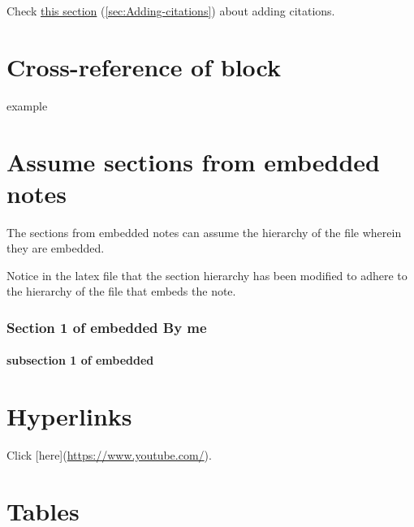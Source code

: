 \documentclass{doc_class_fontsize}{extarticle}
\begin{document}
Check \hyperref[sec:Adding-citations]{this section} (\autoref{sec:Adding-citations}) about adding citations.





\section{\maltese Cross-reference of block}

example



\section{Assume sections from embedded notes}

The sections from embedded notes can assume the hierarchy of the file wherein they are embedded.

\begin{tcolorbox}[width=1.0\textwidth,colback={white},title={note},outer arc=0mm,colupper=black]

Notice in the latex file that the section hierarchy has been modified to adhere to the hierarchy of the file that embeds the note.

\end{tcolorbox}




\subsubsection{Section 1 of embedded By me}
\paragraph{subsection 1 of embedded} %




\section{Hyperlinks}

Click [here](\url{https://www.youtube.com/}).





\section{Tables}
\end{document}
